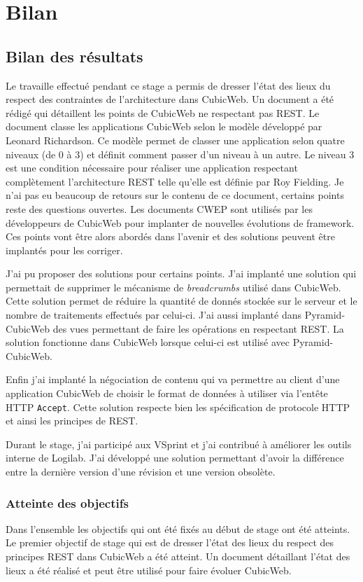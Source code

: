 \chapter{Bilan}
\section{Bilan des résultats}
Le travaille effectué pendant ce stage a permis de dresser l'état des lieux du respect des contraintes de l'architecture  dans CubicWeb. Un document  a été rédigé qui détaillent les points de CubicWeb ne respectant pas REST. Le document classe les applications CubicWeb selon le modèle développé par Leonard Richardson\cite{rmm}. Ce modèle permet de classer une application selon quatre niveaux (de 0 à 3) et définit comment passer d'un niveau à un autre. Le niveau 3 est une condition nécessaire pour réaliser une application respectant complètement l'architecture REST telle qu'elle est définie par Roy Fielding. Je n'ai pas eu beaucoup de retours sur le contenu de ce document, certains points reste des questions ouvertes. Les documents CWEP sont utilisés par les développeurs de CubicWeb pour implanter de nouvelles évolutions de framework. Ces points vont être alors abordés dans l'avenir et des solutions peuvent être implantés pour les corriger. 

J'ai pu proposer des solutions pour certains points. J'ai implanté une solution qui permettait de supprimer le mécanisme de \textit{breadcrumbs} utilisé dans CubicWeb. Cette solution permet de réduire la quantité de donnés stockée sur le serveur et le nombre de traitements effectués par celui-ci. J'ai aussi implanté dans Pyramid-CubicWeb des vues permettant de faire les opérations  en respectant REST. La solution fonctionne dans CubicWeb lorsque celui-ci est utilisé avec Pyramid-CubicWeb. 

Enfin j'ai implanté la négociation de contenu qui va permettre au client d'une application CubicWeb de choisir le format de données à utiliser via l'entête HTTP \texttt{Accept}. Cette solution respecte bien les spécification de protocole HTTP et ainsi les principes de REST. 

Durant le stage, j'ai participé aux VSprint et j'ai contribué à améliorer les outils interne de Logilab. J'ai développé une solution permettant d'avoir la différence entre la dernière version d'une révision et une version obsolète.     
\subsection{Atteinte des objectifs}
Dans l'ensemble les objectifs qui ont été fixés au début de stage ont été atteints. Le premier objectif de stage qui est de dresser l'état des lieux du respect des principes REST dans CubicWeb a été atteint. Un document détaillant l'état des lieux a été réalisé et peut être utilisé pour faire évoluer CubicWeb. 


